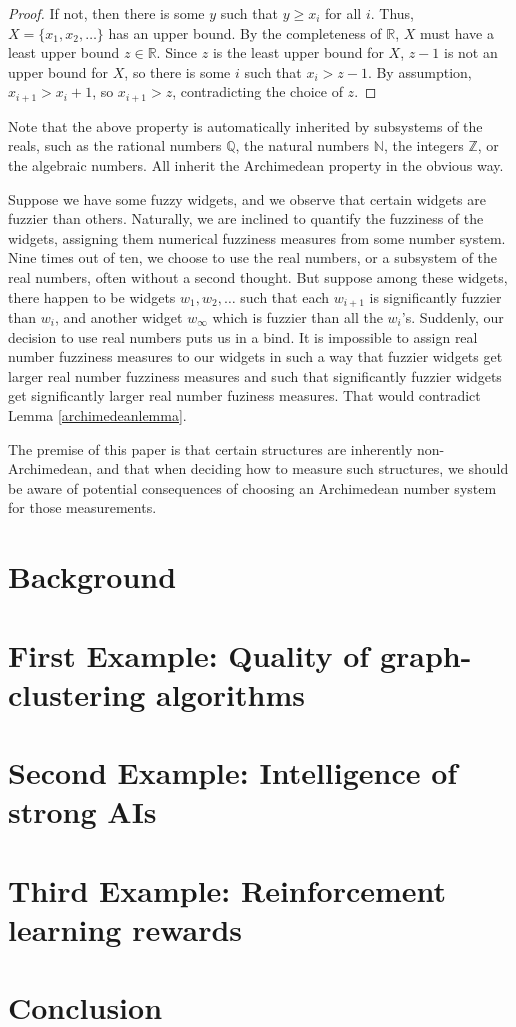 \documentclass[reqno]{article}
\theoremstyle{definition}
\begin{document}
\begin{proof}
If not, then there is some $y$ such that $y\geq x_i$ for all $i$.
Thus, $X=\{x_1,x_2,\ldots\}$ has an upper bound. By the completeness
of $\mathbb R$, $X$ must have a least upper bound $z\in\mathbb R$.
Since $z$ is the least upper bound for $X$, $z-1$ is not an upper bound
for $X$, so there is some $i$ such that $x_i>z-1$.
By assumption, $x_{i+1}>x_i+1$, so $x_{i+1}>z$, contradicting the choice
of $z$.
\end{proof}

Note that the above property is automatically inherited by subsystems
of the reals, such as the rational numbers $\mathbb Q$, the natural
numbers $\mathbb N$, the integers $\mathbb Z$, or the algebraic numbers.
All inherit the Archimedean property in the obvious way.

Suppose we have some fuzzy widgets, and we observe that certain
widgets are fuzzier than others. Naturally, we are inclined to
quantify the fuzziness of the widgets, assigning them numerical
fuzziness measures from some number system. Nine times out of ten,
we choose to use the real numbers, or a subsystem of the real numbers,
often without a second thought. But suppose
among these widgets, there happen to be widgets $w_1,w_2,\ldots$
such that each $w_{i+1}$ is significantly fuzzier than $w_i$,
and another widget $w_\infty$ which is fuzzier than all the $w_i$'s.
Suddenly, our decision to use real numbers puts us in a bind.
It is impossible to assign real number fuzziness measures to our
widgets in such a way that fuzzier widgets get larger real number
fuzziness measures and such that significantly fuzzier widgets get
significantly larger real number fuziness measures. That would
contradict Lemma \ref{archimedeanlemma}.

The premise of this paper is that certain structures are inherently
non-Archimedean, and that when deciding how to measure such structures,
we should be aware of potential consequences of choosing an
Archimedean number system for those measurements.


\section{Background}

\section{First Example: Quality of graph-clustering algorithms}

\section{Second Example: Intelligence of strong AIs}

\section{Third Example: Reinforcement learning rewards}

\section{Conclusion}
\end{document}
